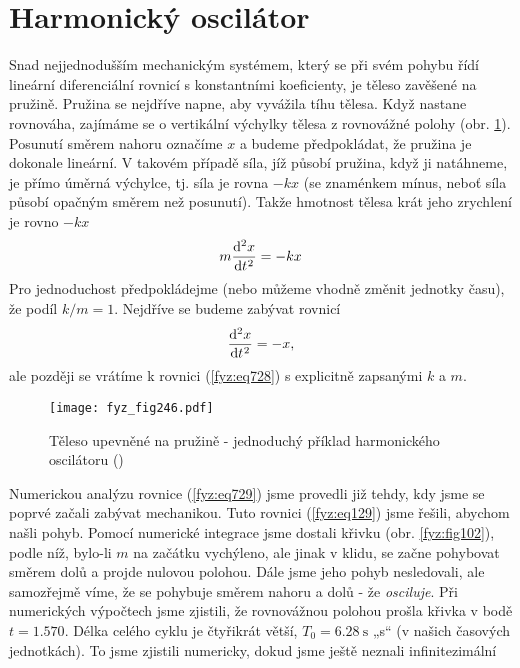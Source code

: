   \section{Harmonický oscilátor}\label{fyz:IchapXXIsecII}
    Snad nejjednodušším mechanickým systémem, který se při svém pohybu řídí lineární diferenciální
    rovnicí s konstantními koeficienty, je těleso zavěšené na pružině. Pružina se nejdříve napne,
    aby vyvážila tíhu tělesa. Když nastane rovnováha, zajímáme se o vertikální výchylky tělesa z
    rovnovážné polohy (obr. \ref{fyz:fig246}). Posunutí směrem nahoru označíme \(x\) a budeme
    předpokládat, že pružina je dokonale lineární. V takovém případě síla, jíž působí pružina, když
    ji natáhneme, je přímo úměrná výchylce, tj. síla je rovna \(-kx\) (se znaménkem mínus, neboť
    síla působí opačným směrem než posunutí). Takže hmotnost tělesa krát jeho zrychlení je rovno
    \(-kx\)
    \begin{equation}\label{fyz:eq728}
      m\diff[2]xt = -kx
    \end{equation}
    Pro jednoduchost předpokládejme (nebo můžeme vhodně změnit jednotky času), že podíl
    \(k/m =1\). Nejdříve se budeme zabývat rovnicí
    \begin{equation}\label{fyz:eq729}
      \diff[2]xt = -x,
    \end{equation}
    ale později se vrátíme k rovnici (\ref{fyz:eq728}) s explicitně zapsanými \(k\) a \(m\).
    \begin{figure}[ht!] %
      \centering
      \texttt{[image: fyz\_fig246.pdf]}
      \caption{Těleso upevněné na pružině - jednoduchý příklad harmonického oscilátoru
               (\cite[s.~287]{Feynman01})}
      \label{fyz:fig246}
    \end{figure}
    Numerickou analýzu rovnice (\ref{fyz:eq729}) jsme provedli již tehdy, kdy jsme se poprvé začali
    zabývat mechanikou. Tuto rovnici (\ref{fyz:eq129}) jsme řešili, abychom našli pohyb. Pomocí
    numerické integrace jsme dostali křivku (obr. \ref{fyz:fig102}), podle níž, bylo-li \(m\) na
    začátku vychýleno, ale jinak v klidu, se začne pohybovat směrem dolů a projde nulovou polohou.
    Dále jsme jeho pohyb nesledovali, ale samozřejmě víme, že se pohybuje směrem nahoru a dolů - že
    \emph{osciluje}. Při numerických výpočtech jsme zjistili, že rovnovážnou polohou prošla křivka v
    bodě \(t= \num{1.570}\). Délka celého cyklu je čtyřikrát větší, \(T_0 =\SI{6.28}{\s}\) „s“ (v
    našich časových jednotkách). To jsme zjistili numericky, dokud jsme ještě neznali inﬁnitezimální
